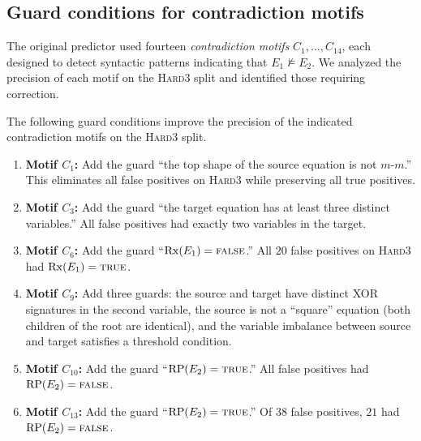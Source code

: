 \subsection{Guard conditions for contradiction motifs}\label{subsec:guards}

The original predictor used fourteen \emph{contradiction motifs}
$C_1, \ldots, C_{14}$, each designed to detect syntactic patterns
indicating that $E_1 \not\models E_2$.  We analyzed the precision of
each motif on the \textsc{Hard3} split and identified those requiring
correction.

\begin{proposition}\label{prop:motif-guards}
The following guard conditions improve the precision of the indicated
contradiction motifs on the \textsc{Hard3} split.
\begin{enumerate}[label=(\roman*)]
\item \textbf{Motif $C_1$:} Add the guard
  ``the top shape of the source equation is not $m$-$m$.''
  This eliminates all false positives on \textsc{Hard3}
  while preserving all true positives.

\item \textbf{Motif $C_3$:} Add the guard
  ``the target equation has at least three distinct variables.''
  All false positives had exactly two variables in the target.

\item \textbf{Motif $C_6$:} Add the guard
  ``$\operatorname{Rx}(E_1) = \textsc{false}$.''
  All $20$ false positives on \textsc{Hard3} had
  $\operatorname{Rx}(E_1) = \textsc{true}$.

\item \textbf{Motif $C_9$:} Add three guards:
  the source and target have distinct XOR signatures in the
  second variable, the source is not a ``square'' equation
  (both children of the root are identical), and the variable
  imbalance between source and target satisfies a threshold condition.

\item \textbf{Motif $C_{10}$:} Add the guard
  ``$\operatorname{RP}(E_2) = \textsc{true}$.''
  All false positives had $\operatorname{RP}(E_2) = \textsc{false}$.

\item \textbf{Motif $C_{13}$:} Add the guard
  ``$\operatorname{RP}(E_2) = \textsc{true}$.''
  Of $38$ false positives, $21$ had
  $\operatorname{RP}(E_2) = \textsc{false}$.
\end{enumerate}
\end{proposition}

